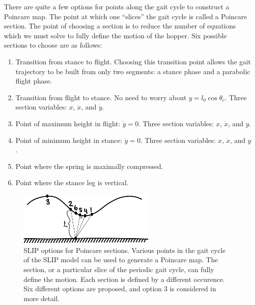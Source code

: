 There are quite a few options for points along the gait cycle to construct a Poincare map. The point at which one ``slices'' the gait cycle is called a Poincare section. The point of choosing a section is to reduce the number of equations which we must solve to fully define the motion of the hopper. Six possible sections to choose are as follows:

\begin{enumerate}

\item Transition from stance to flight. Choosing this transition point allows the gait trajectory to be built from only two segments: a stance phase and a parabolic flight phase. 

\item Transition from flight to stance. No need to worry about $y=l_{0}\cos{\theta_{c}}$. Three section variables: $x$, $\dot{x}$, and $\dot{y}$.

\item Point of maximum height in flight: $\dot{y}=0$. Three section variables: $x$, $\dot{x}$, and $y$.
\label{item:MaxHeight}

\item Point of minimum height in stance: $\dot{y}=0$. Three section variables: $x$, $\dot{x}$, and $y$.

\item Point where the spring is maximally compressed. 

\item Point where the stance leg is vertical.

\end{enumerate}

\begin{figure}[h]		%
\begin{centering}
\includegraphics[width=0.6\textwidth]{Figures/SLIPSections}\par
\end{centering}
\caption[Diagram: SLIP Options for Poincare Sections]{SLIP options for Poincare sections. Various points in the gait cycle of the SLIP model can be used to generate a Poincare map. The section, or a particular slice of the periodic gait cycle, can fully define the motion. Each section is defined by a different occurence. Six different options are proposed, and option 3 is considered in more detail.}
\label{fig:SLIPSections}
\end{figure}
%

